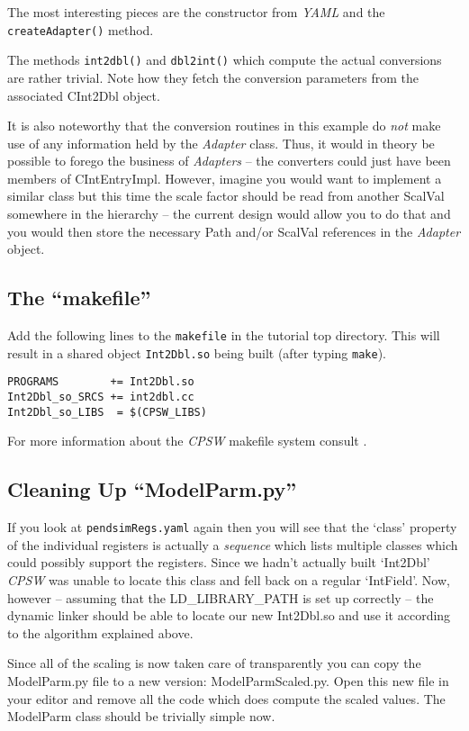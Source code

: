 \documentclass[10pt]{article}
\newcommand{\ita}[1]{\emph{#1}}
\newcommand{\cpsw}      {\ita {CPSW}}
\newcommand{\yaml}      {\ita {YAML}}
\newcommand{\Path}      {{Path}}
\newcommand{\cod}[1] {{\tt#1}}
\begin{document}
The most interesting pieces are the constructor from \yaml{} and the \cod{createAdapter()}
method.

The methods \cod{int2dbl()} and \cod{dbl2int()} which compute the actual conversions
are rather trivial.
Note how they fetch the conversion parameters from the associated CInt2Dbl object.

It is also noteworthy that the conversion routines in this example do {\em not} make
use of any information held by the {\em Adapter} class. Thus, it would in theory be
possible to forego the business of {\em Adapters} -- the converters could just have
been members of CIntEntryImpl. However, imagine you would want to implement a similar
class but this time the scale factor should be read from another ScalVal somewhere in
the hierarchy -- the current design would allow you to do that and you would then
store the necessary \Path{} and/or ScalVal references in the {\em Adapter} object.

\subsection{The ``makefile''}
Add the following lines to the \cod{makefile} in the tutorial top directory. This
will result in a shared object \cod{Int2Dbl.so} being built (after typing \cod{make}). 
\begin{verbatim}
PROGRAMS        += Int2Dbl.so
Int2Dbl_so_SRCS += int2dbl.cc
Int2Dbl_so_LIBS  = $(CPSW_LIBS)
\end{verbatim}
For more information about the \cpsw{} makefile system consult \cite{makefile, INSTALL}.

\subsection{Cleaning Up ``ModelParm.py''}
If you look at \cod{pendsimRegs.yaml} again then you will see that the `class' property
of the individual registers is actually a {\em sequence} which lists multiple classes 
which could possibly support the registers.
Since we hadn't actually built `Int2Dbl' \cpsw{} was unable to locate this class and
fell back on a regular `IntField'. Now, however -- assuming that the LD\_LIBRARY\_PATH
is set up correctly -- the dynamic linker should be able to locate our new Int2Dbl.so
and use it according to the algorithm explained above.

Since all of the scaling is now taken care of transparently you can copy the 
ModelParm.py file to a new version: ModelParmScaled.py. Open this new file in your
editor and remove all the code which does compute the scaled values.
The ModelParm class should be trivially simple now.
\end{document}
